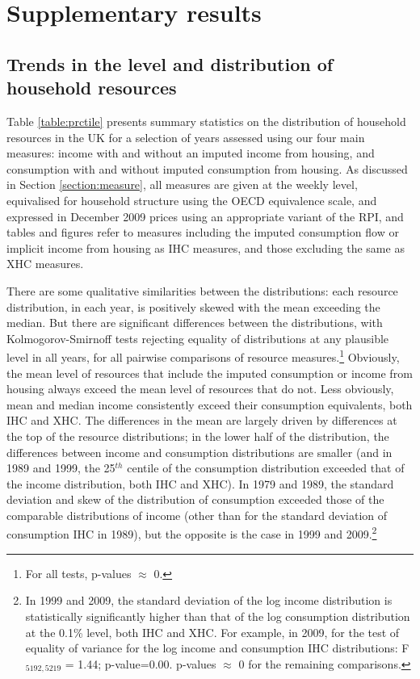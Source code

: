 \section{Supplementary results} \label{sec:annex_results}


\subsection{Trends in the level and distribution of household resources}\label{subsec:aggregate_trends}

Table \ref{table:prctile} presents summary statistics on the distribution of household resources in the UK for a selection of years assessed using our four main measures: income with and without an imputed income from housing, and consumption with and without imputed consumption from housing. As discussed in Section \ref{section:measure}, all measures are given at the weekly level, equivalised for household structure using the OECD equivalence scale, and expressed in December 2009 prices using an appropriate variant of the RPI, and tables and figures refer to measures including the imputed consumption flow or implicit income from housing as IHC measures, and those excluding the same as XHC measures.  

There are some qualitative similarities between the distributions: each resource distribution, in each year, is positively skewed with the mean exceeding the median. But there are significant differences between the distributions, with Kolmogorov-Smirnoff tests rejecting equality of distributions at any plausible level in all years, for all pairwise comparisons of resource measures.\footnote{For all tests, p-values $\approx$ 0.} Obviously, the mean level of resources that include the imputed consumption or income from housing always exceed the mean level of resources that do not. Less obviously, mean and median income consistently exceed their consumption equivalents, both IHC and XHC. The differences in the mean are largely driven by differences at the top of the resource distributions; in the lower half of the distribution, the differences between income and consumption distributions are smaller (and in 1989 and 1999, the 25$^{th}$ centile of the consumption distribution exceeded that of the income distribution, both IHC and XHC). In 1979 and 1989, the standard deviation and skew of the distribution of consumption exceeded those of the comparable distributions of income (other than for the standard deviation of consumption IHC in 1989), but the opposite is the case in 1999 and 2009.\footnote{In 1999 and 2009, the standard deviation of the log income distribution is statistically significantly higher than that of the log consumption distribution at the 0.1\% level, both IHC and XHC. For example, in 2009, for the test of equality of variance for the log income and consumption IHC distributions: F$_{5192,5219}$ = 1.44; p-value=0.00. p-values $\approx$ 0 for the remaining comparisons.} 


